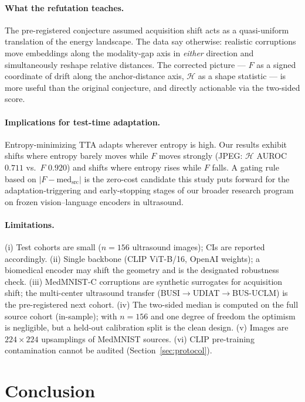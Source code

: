 \documentclass[11pt]{article}
\newcommand{\Hent}{\mathcal{H}}
\begin{document}
\paragraph{What the refutation teaches.} The pre-registered conjecture assumed
acquisition shift acts as a quasi-uniform translation of the energy landscape.
The data say otherwise: realistic corruptions move embeddings along the
modality-gap axis in \emph{either} direction and simultaneously reshape
relative distances. The corrected picture --- $F$ as a signed coordinate of
drift along the anchor-distance axis, $\Hent$ as a shape statistic --- is more
useful than the original conjecture, and directly actionable via the two-sided
score.

\paragraph{Implications for test-time adaptation.} Entropy-minimizing TTA
\citep{wang2021tent,shu2022tpt} adapts wherever entropy is high. Our results
exhibit shifts where entropy barely moves while $F$ moves strongly (JPEG:
$\Hent$ AUROC $0.711$ vs.\ $F$ $0.920$) and shifts where entropy rises while
$F$ falls. A gating rule based on $|F-\mathrm{med}_{\mathrm{src}}|$ is the
zero-cost candidate this study puts forward for the adaptation-triggering and
early-stopping stages of our broader research program on frozen
vision--language encoders in ultrasound.

\paragraph{Limitations.} (i) Test cohorts are small ($n=156$ ultrasound
images); CIs are reported accordingly. (ii) Single backbone (CLIP ViT-B/16,
OpenAI weights); a biomedical encoder \citep{zhang2023biomedclip} may shift
the geometry and is the designated robustness check. (iii) MedMNIST-C
corruptions are synthetic surrogates for acquisition shift; the multi-center
ultrasound transfer (BUSI$\to$UDIAT$\to$BUS-UCLM) is the pre-registered next
cohort. (iv) The two-sided median is computed on the full source cohort
(in-sample); with $n=156$ and one degree of freedom the optimism is
negligible, but a held-out calibration split is the clean design. (v) Images
are $224\times224$ upsamplings of MedMNIST sources. (vi) CLIP pre-training
contamination cannot be audited (Section~\ref{sec:protocol}).

\section{Conclusion}
\end{document}
